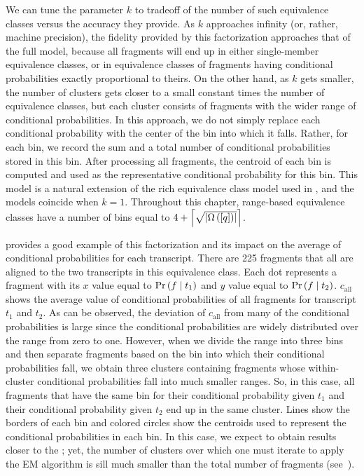 We can tune the parameter $k$ to tradeoff of the number of such equivalence classes versus 
the accuracy they provide. As $k$ approaches infinity (or, rather, machine precision), the 
fidelity provided by this factorization approaches that of the full model, because all 
fragments will end up in either single-member equivalence classes, or in equivalence classes 
of fragments having conditional probabilities exactly proportional to theirs. On the other 
hand, as $k$ gets smaller, the number of clusters gets closer to a small constant times the 
number of \cb equivalence classes, but each cluster consists of fragments with the wider 
range of conditional probabilities.  In this approach, we do not simply replace each 
conditional probability with the center of the bin into which it falls.  Rather, for 
each bin, we record the sum and a total number of conditional probabilities stored in 
this bin.  After processing all fragments, the centroid of each bin is computed and used 
as the representative conditional probability for this bin.  This model is a natural 
extension of the rich equivalence class model used in \salmon, and the models coincide 
when $k = 1$. Throughout this chapter, range-based equivalence classes have a number of 
bins equal to $4 + \left\lceil \sqrt{\left|\Omega\left(\left[q\right]\right)\right|} \right\rceil$. 

 provides a good example of this factorization and its impact on 
the average of conditional probabilities for each transcript. There are 225 fragments 
that all are aligned to the two transcripts in this equivalence class. Each dot represents 
a fragment with its $x$ value equal to $\Prob{f}{t_1}$ and $y$ value equal to 
$\Prob{f}{t_2}$. $c_{\text{all}}$ shows the average value of conditional probabilities 
of all fragments for transcript $t_1$ and $t_2$. As can be observed, the deviation of 
$c_{\text{all}}$ from many of the conditional probabilities is large since the conditional 
probabilities are widely distributed over the range from zero to one. However, when we 
divide the range into three bins and then separate fragments based on the bin into which 
their conditional probabilities fall, we obtain three clusters containing fragments whose 
within-cluster conditional probabilities fall into much smaller ranges. So, in this case, 
all fragments that have the same bin for their conditional probability given $t_1$ and 
their conditional probability given $t_2$ end up in the same cluster. Lines show the 
borders of each bin and colored circles show the centroids used to represent the conditional 
probabilities in each bin. In this case, we expect to obtain results closer to the \fm; yet, 
the number of clusters over which one must iterate to apply the EM algorithm is sill much 
smaller than the total number of fragments (see~).

